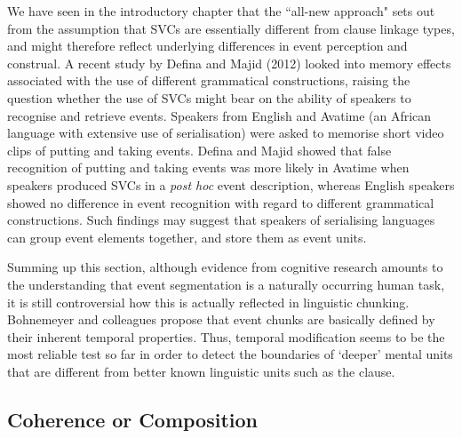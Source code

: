 We have seen in the introductory chapter that the ``all-new approach" sets out from the assumption that SVCs are essentially different from clause linkage types, and might therefore reflect underlying differences in event perception and construal. A recent study by Defina and Majid (2012) looked into memory effects associated with the use of different grammatical constructions, raising the question whether the use of SVCs might bear on the ability of speakers to recognise and retrieve events. Speakers from English and Avatime (an African language with extensive use of serialisation) were asked to memorise short video clips of putting and taking events. Defina and Majid showed that false recognition of putting and taking events was more likely in Avatime when speakers produced SVCs in a \textit{post hoc} event description, whereas English speakers showed no difference in event recognition with regard to different grammatical constructions. Such findings may suggest that speakers of serialising languages can group event elements together, and store them as event units.

Summing up this section, although evidence from cognitive research amounts to the understanding that event segmentation is a naturally occurring human task, it is still controversial how this is actually reflected in linguistic chunking. Bohnemeyer and colleagues propose that event chunks are basically defined by their inherent temporal properties. Thus, temporal modification seems to be the most reliable test so far in order to detect the boundaries of `deeper' mental units that are different from better known linguistic units such as the clause.

\subsection{Coherence or Composition} \label{sec:coherence}


